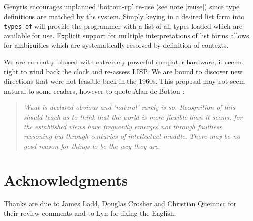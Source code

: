 \documentclass[a4paper,12pt,dvips]{article}
\begin{document}
Genyris encourages unplanned `bottom-up' re-use (see note \ref{reuse}) since type definitions are matched by the system. Simply keying in a desired list form into \texttt{types-of} will provide the programmer with a list of all types loaded which are available for use.  Explicit support for multiple interpretations of list forms allows for ambiguities which are systematically resolved by definition of contexts.   
   
We are currently blessed with extremely powerful computer hardware, it seems right to wind back the clock and re-assess LISP. We are bound to discover new directions that were not feasible back in the 1960s. This proposal may not seem natural to some readers, however to quote Alan de Botton \cite{alan}: 
\begin{quote}
\textit{What is declared obvious and 'natural' rarely is so. Recognition of this should teach us to think that the world is more flexible than it seems, for the established views have frequently emerged not through faultless reasoning but through centuries of intellectual muddle. There may be no good reason for things to be the way they are.}
\end{quote}

\appendix
\section{Acknowledgments}
Thanks are due to James Ladd, Douglas Crosher and Christian Queinnec for their review comments and to Lyn for fixing the English.
\end{document}
